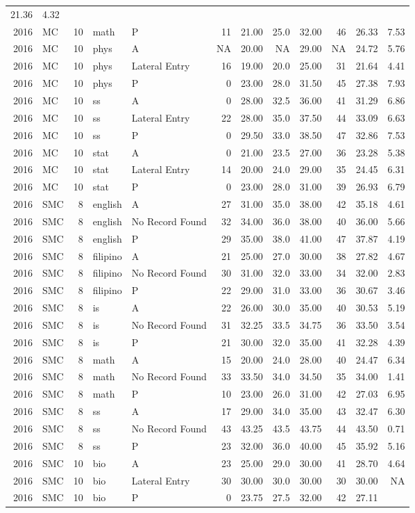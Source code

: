 \documentclass[]{article}
\begin{document}
\begin{longtable}[]{@{}rlrllrrrrrrr@{}}
21.36 & 4.32\tabularnewline
2016 & MC & 10 & math & P & 11 & 21.00 & 25.0 & 32.00 & 46 & 26.33 &
7.53\tabularnewline
2016 & MC & 10 & phys & A & NA & 20.00 & NA & 29.00 & NA & 24.72 &
5.76\tabularnewline
2016 & MC & 10 & phys & Lateral Entry & 16 & 19.00 & 20.0 & 25.00 & 31 &
21.64 & 4.41\tabularnewline
2016 & MC & 10 & phys & P & 0 & 23.00 & 28.0 & 31.50 & 45 & 27.38 &
7.93\tabularnewline
2016 & MC & 10 & ss & A & 0 & 28.00 & 32.5 & 36.00 & 41 & 31.29 &
6.86\tabularnewline
2016 & MC & 10 & ss & Lateral Entry & 22 & 28.00 & 35.0 & 37.50 & 44 &
33.09 & 6.63\tabularnewline
2016 & MC & 10 & ss & P & 0 & 29.50 & 33.0 & 38.50 & 47 & 32.86 &
7.53\tabularnewline
2016 & MC & 10 & stat & A & 0 & 21.00 & 23.5 & 27.00 & 36 & 23.28 &
5.38\tabularnewline
2016 & MC & 10 & stat & Lateral Entry & 14 & 20.00 & 24.0 & 29.00 & 35 &
24.45 & 6.31\tabularnewline
2016 & MC & 10 & stat & P & 0 & 23.00 & 28.0 & 31.00 & 39 & 26.93 &
6.79\tabularnewline
2016 & SMC & 8 & english & A & 27 & 31.00 & 35.0 & 38.00 & 42 & 35.18 &
4.61\tabularnewline
2016 & SMC & 8 & english & No Record Found & 32 & 34.00 & 36.0 & 38.00 &
40 & 36.00 & 5.66\tabularnewline
2016 & SMC & 8 & english & P & 29 & 35.00 & 38.0 & 41.00 & 47 & 37.87 &
4.19\tabularnewline
2016 & SMC & 8 & filipino & A & 21 & 25.00 & 27.0 & 30.00 & 38 & 27.82 &
4.67\tabularnewline
2016 & SMC & 8 & filipino & No Record Found & 30 & 31.00 & 32.0 & 33.00
& 34 & 32.00 & 2.83\tabularnewline
2016 & SMC & 8 & filipino & P & 22 & 29.00 & 31.0 & 33.00 & 36 & 30.67 &
3.46\tabularnewline
2016 & SMC & 8 & is & A & 22 & 26.00 & 30.0 & 35.00 & 40 & 30.53 &
5.19\tabularnewline
2016 & SMC & 8 & is & No Record Found & 31 & 32.25 & 33.5 & 34.75 & 36 &
33.50 & 3.54\tabularnewline
2016 & SMC & 8 & is & P & 21 & 30.00 & 32.0 & 35.00 & 41 & 32.28 &
4.39\tabularnewline
2016 & SMC & 8 & math & A & 15 & 20.00 & 24.0 & 28.00 & 40 & 24.47 &
6.34\tabularnewline
2016 & SMC & 8 & math & No Record Found & 33 & 33.50 & 34.0 & 34.50 & 35
& 34.00 & 1.41\tabularnewline
2016 & SMC & 8 & math & P & 10 & 23.00 & 26.0 & 31.00 & 42 & 27.03 &
6.95\tabularnewline
2016 & SMC & 8 & ss & A & 17 & 29.00 & 34.0 & 35.00 & 43 & 32.47 &
6.30\tabularnewline
2016 & SMC & 8 & ss & No Record Found & 43 & 43.25 & 43.5 & 43.75 & 44 &
43.50 & 0.71\tabularnewline
2016 & SMC & 8 & ss & P & 23 & 32.00 & 36.0 & 40.00 & 45 & 35.92 &
5.16\tabularnewline
2016 & SMC & 10 & bio & A & 23 & 25.00 & 29.0 & 30.00 & 41 & 28.70 &
4.64\tabularnewline
2016 & SMC & 10 & bio & Lateral Entry & 30 & 30.00 & 30.0 & 30.00 & 30 &
30.00 & NA\tabularnewline
2016 & SMC & 10 & bio & P & 0 & 23.75 & 27.5 & 32.00 & 42 & 27.11 &

\end{longtable}
\end{document}
